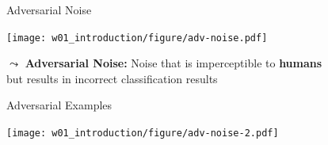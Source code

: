 \documentclass[aspectratio=169]{../latex_main/tntbeamer}  %
\begin{document}
	
\begin{frame}[c]{Adversarial Noise~}
    
    \centering
    \texttt{[image: w01\_introduction/figure/adv-noise.pdf]}
	
	$\leadsto$ \textbf{Adversarial Noise:} Noise that is imperceptible to \textbf{humans}\\ but results in incorrect classification results
	
\end{frame}

\begin{frame}[c]{Adversarial Examples~}
    
    \centering
    \texttt{[image: w01\_introduction/figure/adv-noise-2.pdf]}
	
\end{frame}
\end{document}
